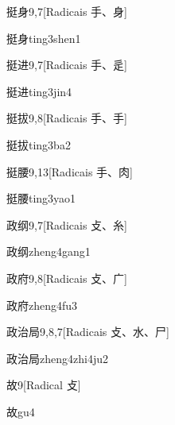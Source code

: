 \begin{entry}{挺身}{9,7}[Radicais ⼿、⾝]
  \begin{phonetics}{挺身}{ting3shen1}
  \end{phonetics}
\end{entry}

\begin{entry}{挺进}{9,7}[Radicais ⼿、⾡]
  \begin{phonetics}{挺进}{ting3jin4}
  \end{phonetics}
\end{entry}

\begin{entry}{挺拔}{9,8}[Radicais ⼿、⼿]
  \begin{phonetics}{挺拔}{ting3ba2}
  \end{phonetics}
\end{entry}

\begin{entry}{挺腰}{9,13}[Radicais ⼿、⾁]
  \begin{phonetics}{挺腰}{ting3yao1}
  \end{phonetics}
\end{entry}

\begin{entry}{政纲}{9,7}[Radicais ⽁、⽷]
  \begin{phonetics}{政纲}{zheng4gang1}
  \end{phonetics}
\end{entry}

\begin{entry}{政府}{9,8}[Radicais ⽁、⼴]
  \begin{phonetics}{政府}{zheng4fu3}
  \end{phonetics}
\end{entry}

\begin{entry}{政治局}{9,8,7}[Radicais ⽁、⽔、⼫]
  \begin{phonetics}{政治局}{zheng4zhi4ju2}
  \end{phonetics}
\end{entry}

\begin{entry}{故}{9}[Radical ⽁]
  \begin{phonetics}{故}{gu4}
  \end{phonetics}
\end{entry}

